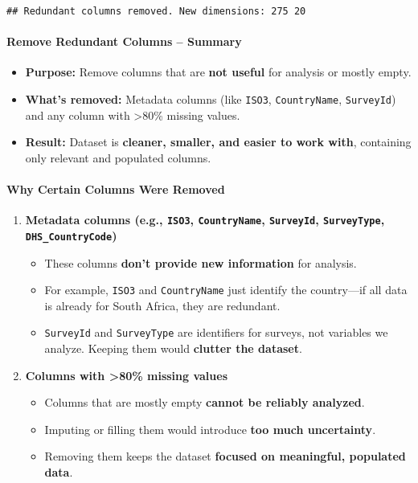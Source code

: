 \documentclass[
]{article}
\providecommand{\tightlist}{%
  \setlength{\itemsep}{0pt}\setlength{\parskip}{0pt}}
\begin{document}
\begin{verbatim}
## Redundant columns removed. New dimensions: 275 20
\end{verbatim}

\paragraph{Remove Redundant Columns --
Summary}\label{remove-redundant-columns-summary}

\begin{itemize}
\tightlist
\item
  \textbf{Purpose:} Remove columns that are \textbf{not useful} for
  analysis or mostly empty.
\item
  \textbf{What's removed:} Metadata columns (like \texttt{ISO3},
  \texttt{CountryName}, \texttt{SurveyId}) and any column with
  \textgreater80\% missing values.
\item
  \textbf{Result:} Dataset is \textbf{cleaner, smaller, and easier to
  work with}, containing only relevant and populated columns.
\end{itemize}

\paragraph{Why Certain Columns Were
Removed}\label{why-certain-columns-were-removed}

\begin{enumerate}
\def\labelenumi{\arabic{enumi}.}
\item
  \textbf{Metadata columns (e.g., \texttt{ISO3}, \texttt{CountryName},
  \texttt{SurveyId}, \texttt{SurveyType}, \texttt{DHS\_CountryCode})}

  \begin{itemize}
  \tightlist
  \item
    These columns \textbf{don't provide new information} for analysis.
  \item
    For example, \texttt{ISO3} and \texttt{CountryName} just identify
    the country---if all data is already for South Africa, they are
    redundant.
  \item
    \texttt{SurveyId} and \texttt{SurveyType} are identifiers for
    surveys, not variables we analyze. Keeping them would
    \textbf{clutter the dataset}.
  \end{itemize}
\item
  \textbf{Columns with \textgreater80\% missing values}

  \begin{itemize}
  \tightlist
  \item
    Columns that are mostly empty \textbf{cannot be reliably analyzed}.
  \item
    Imputing or filling them would introduce \textbf{too much
    uncertainty}.
  \item
    Removing them keeps the dataset \textbf{focused on meaningful,
    populated data}.
  \end{itemize}
\end{enumerate}
\end{document}
